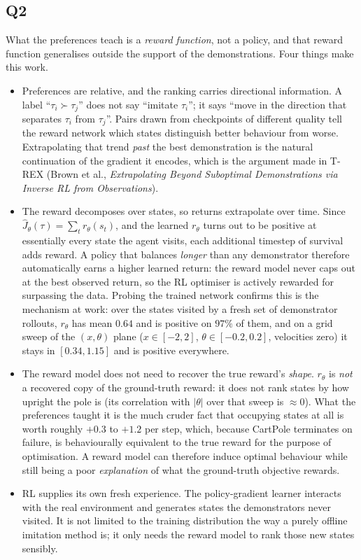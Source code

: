 \documentclass[11pt]{article}
\begin{document}
\subsection*{Q2}

What the preferences teach is a \emph{reward function}, not a policy, and that reward function
generalises outside the support of the demonstrations. Four things make this work.

\begin{itemize}
  \item Preferences are relative, and the ranking carries directional information. A label ``$\tau_i \succ \tau_j$'' does not say ``imitate $\tau_i$''; it says ``move in the
  direction that separates $\tau_i$ from $\tau_j$''. Pairs drawn from checkpoints of different
  quality tell the reward network which states distinguish better behaviour from worse.
  Extrapolating that trend \emph{past} the best demonstration is the natural continuation of
  the gradient it encodes, which is the argument made in T-REX (Brown et al., \emph{Extrapolating
  Beyond Suboptimal Demonstrations via Inverse RL from Observations}).
  \item The reward decomposes over states, so returns extrapolate over time. Since $\hat{J}_\theta(\tau) = \sum_t r_\theta(s_t)$, and the learned $r_\theta$ turns out to be
  positive at essentially every state the agent visits, each additional timestep of survival adds
  reward. A policy that balances \emph{longer} than any demonstrator therefore automatically earns
  a higher learned return: the reward model never caps out at the best observed return, so the RL
  optimiser is actively rewarded for surpassing the data. Probing the trained network confirms
  this is the mechanism at work: over the states visited by a fresh set of demonstrator
  rollouts, $r_\theta$ has mean $0.64$ and is positive on $97\%$ of them, and on a grid sweep of
  the $(x,\theta)$ plane ($x \in [-2,2]$, $\theta \in [-0.2,0.2]$, velocities zero) it stays in
  $[0.34, 1.15]$ and is positive everywhere.
  \item The reward model does not need to recover the true reward's \emph{shape}.
  $r_\theta$ is \emph{not} a recovered copy of the ground-truth reward: it does not rank
  states by how upright the pole is (its correlation with $|\theta|$ over that sweep is
  $\approx 0$). What the preferences taught it is the much cruder fact that occupying states at
  all is worth roughly $+0.3$ to $+1.2$ per step, which, because CartPole terminates on
  failure, is behaviourally equivalent to the true reward for the purpose of optimisation. A
  reward model can therefore induce optimal behaviour while still being a poor
  \emph{explanation} of what the ground-truth objective rewards.
  \item RL supplies its own fresh experience. The policy-gradient learner interacts
  with the real environment and generates states the demonstrators never visited. It is not
  limited to the training distribution the way a purely offline imitation method is; it only
  needs the reward model to rank those new states sensibly.
\end{itemize}
\end{document}

